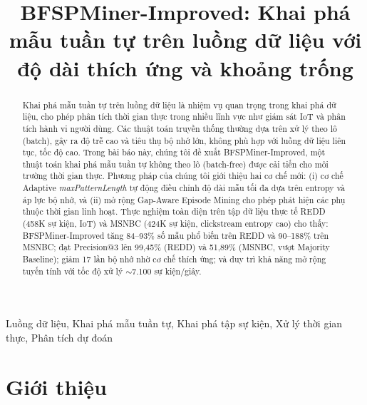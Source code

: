 \documentclass{article}
\begin{document}
\title{BFSPMiner-Improved: Khai phá mẫu tuần tự trên luồng dữ liệu với độ dài thích ứng và khoảng trống}

\address{Học viện Kỹ thuật Quân sự\\Viện Công nghệ Thông tin \& Truyền thông}

\maketitle

\begin{abstract}
Khai phá mẫu tuần tự trên luồng dữ liệu là nhiệm vụ quan trọng trong khai phá dữ liệu, cho phép phân tích thời gian thực trong nhiều lĩnh vực như giám sát IoT và phân tích hành vi người dùng. Các thuật toán truyền thống thường dựa trên xử lý theo lô (batch), gây ra độ trễ cao và tiêu thụ bộ nhớ lớn, không phù hợp với luồng dữ liệu liên tục, tốc độ cao. Trong bài báo này, chúng tôi đề xuất BFSPMiner-Improved, một thuật toán khai phá mẫu tuần tự không theo lô (batch-free) được cải tiến cho môi trường thời gian thực. Phương pháp của chúng tôi giới thiệu hai cơ chế mới: (i) cơ chế Adaptive \textit{maxPatternLength} tự động điều chỉnh độ dài mẫu tối đa dựa trên entropy và áp lực bộ nhớ, và (ii) mở rộng Gap-Aware Episode Mining cho phép phát hiện các phụ thuộc thời gian linh hoạt. Thực nghiệm toàn diện trên tập dữ liệu thực tế REDD (458K sự kiện, IoT) và MSNBC (424K sự kiện, clickstream entropy cao) cho thấy: BFSPMiner-Improved tăng 84--93\% số mẫu phổ biến trên REDD và 90--188\% trên MSNBC; đạt Precision@3 lên 99,45\% (REDD) và 51,89\% (MSNBC, vượt Majority Baseline); giảm 17 lần bộ nhớ nhờ cơ chế thích ứng; và duy trì khả năng mở rộng tuyến tính với tốc độ xử lý $\sim$7.100 sự kiện/giây.
\end{abstract}

\begin{keywords}
Luồng dữ liệu, Khai phá mẫu tuần tự, Khai phá tập sự kiện, Xử lý thời gian thực, Phân tích dự đoán
\end{keywords}

\section{Giới thiệu}
\label{sec:intro}
\end{document}
